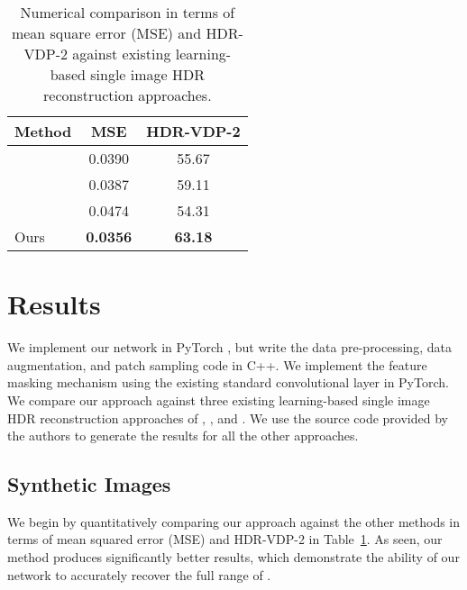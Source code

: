 \begin{table}
\hspace*{-2cm}
\caption{Numerical comparison in terms of mean square error (MSE) and HDR-VDP-2 \cite{mantiuk2011hdr} against existing learning-based single image HDR reconstruction approaches.}
\vspace{-0.1in}
\begin{tabular}{lll}\hline
\textbf{Method}    & \multicolumn{1}{c}{\textbf{MSE}}   & \multicolumn{1}{c}{\textbf{HDR-VDP-2}}        \\\hline
\citet{endo2017deep}  &  \multicolumn{1}{c}{0.0390} &  \multicolumn{1}{c}{55.67}\\
\citet{eilertsen2017hdr}  &  \multicolumn{1}{c}{0.0387} &  \multicolumn{1}{c}{59.11} \\
\citet{marnerides2018expandnet}  & \multicolumn{1}{c}{0.0474}  &  \multicolumn{1}{c}{54.31} \\
Ours  & \multicolumn{1}{c}{\textbf{0.0356}}  & \multicolumn{1}{c}{\textbf{63.18}} \\\hline
\end{tabular}
\label{table:existing}
\vspace{-0.2in}
\end{table}

\section{Results}
\label{sec:results}
We implement our network in PyTorch \cite{paszke2017automatic}, but write the data pre-processing, data augmentation, and patch sampling code in C++.  We implement the feature masking mechanism using the existing standard convolutional layer in PyTorch. We compare our approach against three existing learning-based single image HDR reconstruction approaches of \citet{endo2017deep}, \citet{eilertsen2017hdr}, and \citet{marnerides2018expandnet}. We use the source code provided by the authors to generate the results for all the other approaches.

\subsection{Synthetic Images}
We begin by quantitatively comparing our approach against the other methods in terms of mean squared error (MSE) and HDR-VDP-2 \cite{mantiuk2011hdr} in Table~\ref{table:existing}. 
As seen, our method produces significantly better results, which demonstrate the ability of our network to accurately recover the full range of .

